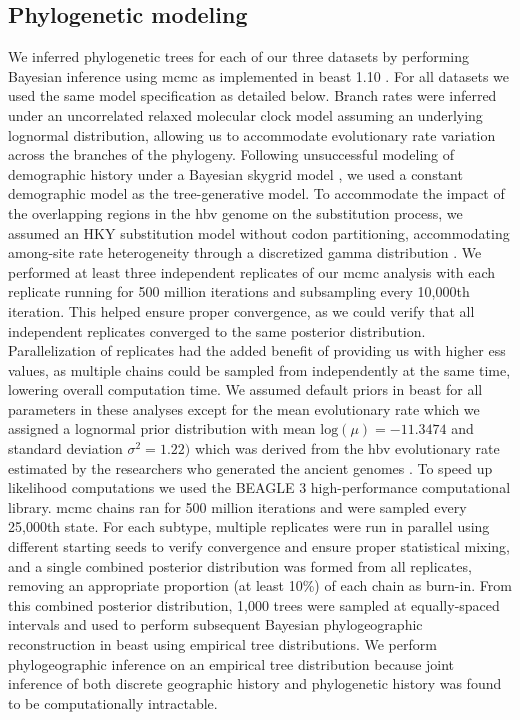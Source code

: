 \subsection{Phylogenetic modeling}

We inferred phylogenetic trees for each of our three datasets by performing Bayesian inference using \gls{mcmc} as implemented in \gls{beast} 1.10 \cite{suchard2018bayesian}.
For all datasets we used the same model specification as detailed below.
Branch rates were inferred under an uncorrelated relaxed molecular clock model assuming an underlying lognormal distribution, allowing us to accommodate evolutionary rate variation across the branches of the phylogeny.
Following unsuccessful modeling of demographic history under a Bayesian skygrid model \cite{gill2013improving}, we used a constant demographic model as the tree-generative model. %
To accommodate the impact of the overlapping regions in the \gls{hbv} genome on the substitution process, we assumed an HKY substitution model \cite{hasegawa1985dating} without codon partitioning, accommodating among-site rate heterogeneity through a discretized gamma distribution \cite{yang1993maximum}.
We performed at least three independent replicates of our \gls{mcmc} analysis with each replicate running for 500 million iterations and subsampling every 10,000th iteration.
This helped ensure proper convergence, as we could verify that all independent replicates converged to the same posterior distribution.
Parallelization of replicates had the added benefit of providing us with higher \gls{ess} values, as multiple chains could be sampled from independently at the same time, lowering overall computation time.
We assumed default priors in \gls{beast} for all parameters in these analyses except for the mean evolutionary rate which we assigned a lognormal prior distribution with mean $\text{log}(\mu)=-11.3474$ and standard deviation $\sigma^{2}=1.22)$ which was derived from the \gls{hbv} evolutionary rate estimated by the researchers who generated the ancient genomes \cite{muhlemann2018ancient}.
To speed up likelihood computations we used the BEAGLE 3 high-performance computational library.
\gls{mcmc} chains ran for 500 million iterations and were sampled every 25,000th state.
For each subtype, multiple replicates were run in parallel using different starting seeds to verify convergence and ensure proper statistical mixing, and a single combined posterior distribution was formed from all replicates, removing an appropriate proportion (at least 10\%) of each chain as burn-in.
From this combined posterior distribution, 1,000 trees were sampled at equally-spaced intervals and used to perform subsequent Bayesian phylogeographic reconstruction in \gls{beast} using empirical tree distributions.
We perform phylogeographic inference on an empirical tree distribution because joint inference of both discrete geographic history and phylogenetic history was found to be computationally intractable.


